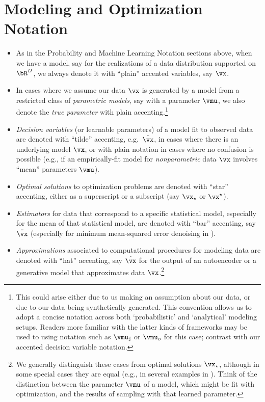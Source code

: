 \section*{Modeling and Optimization Notation}
\begin{itemize}
    \item As in the Probability and Machine Learning Notation sections above,
        when we have a model, say for the realizations of
        a data distribution supported on $\bR^D$, we always denote it with
        ``plain'' accented variables, say $\vx$.
    \item In cases where we assume our data $\vx$ is generated by a model from
        a restricted class of \textit{parametric models}, say with
        a parameter $\vmu$, we also denote the \textit{true parameter} with
        plain accenting.\footnote{This could arise either due to us making an
        assumption about our data, or due to our data being synthetically
        generated. This convention allows us to adopt a concise notation across
        both `probabilistic' and `analytical' modeling setups. Readers more
        familiar with the latter kinds of frameworks may be used to using
        notation such as $\vmu_{\sharp}$ or $\vmu_o$ for this case; contrast
        with our accented decision variable notation.}
    \item \textit{Decision variables} (or learnable parameters) of a model fit
        to observed data are denoted with ``tilde'' accenting, e.g.\
        $\tilde{\vx}$, in cases where there is an underlying model $\vx$, or
        with plain notation in cases where no confusion is possible (e.g., if
        an empirically-fit model for \textit{nonparametric} data $\vx$ involves
        ``mean'' parameters $\vmu$).
    \item \textit{Optimal solutions} to optimization problems are denoted with
        ``star'' accenting, either as a superscript or a subscript (say
        $\vx_\star$ or $\vx^\star$).
    \item \textit{Estimators} for data that correspond to a specific statistical
        model, especially for the mean of that statistical model, are denoted
        with ``bar'' accenting, say $\bar{\vx}$ (especially for minimum
        mean-squared error denoising in \Cref{ch:denoising}).
    \item \textit{Approximations} associated to computational procedures for
        modeling data are denoted with ``hat'' accenting, say $\hat{\vx}$ for
        the output of an autoencoder or a generative model that approximates
        data $\vx$.\footnote{We generally distinguish these cases from optimal
        solutions $\vx_{\star}$, although in some special cases they are
        equal (e.g., in several examples in \Cref{ch:classic-models}). Think of
        the distinction between the parameter $\vmu$ of a model, which might be
        fit with optimization, and the results of sampling with that learned
        parameter.}
\end{itemize}
